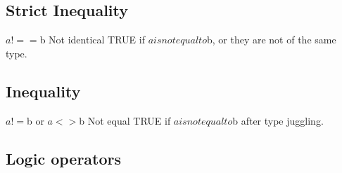 \documentclass{article}
\begin{document}
\begin{kdefinition}
\begin{module}{}
\begin{kblock}[text]
 \subsection{Strict Inequality} 
		$a !== $b	Not identical	TRUE if $a is not equal to $b, 
		or they are not of the same type.\end{kblock}
\begin{kblock}[text]
 \subsection{Inequality} 
		$a != $b or $a <> $b 	Not equal	TRUE if $a is not equal to $b after type juggling.\end{kblock}
\begin{kblock}[text]
 \section{Logic operators} \end{kblock}
\begin{kblock}[text]

\end{kblock}
\end{module}
\end{kdefinition}
\end{document}
